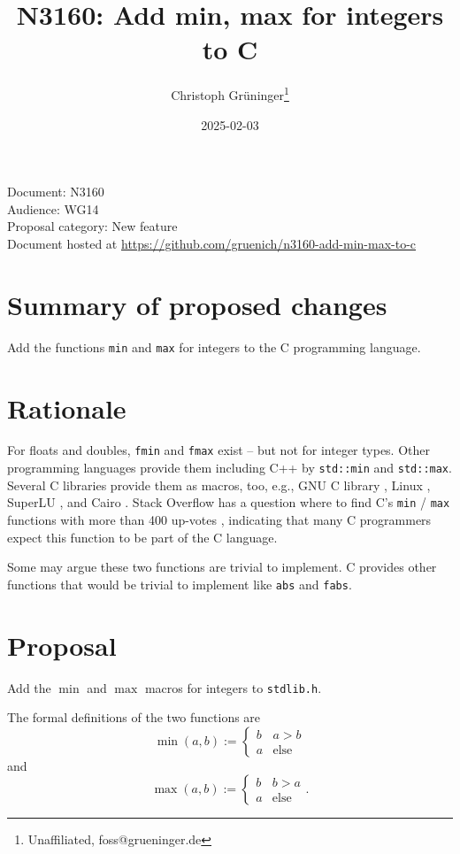 \documentclass[a4paper,10pt]{scrartcl}
\title{N3160: Add min, max for integers to C}
\author{Christoph Grüninger\footnote{Unaffiliated, foss@grueninger.de}}
\date{2025-02-03}
\begin{document}
\lstset{language=C,basicstyle=\ttfamily}

\maketitle

\noindent
Document: N3160\\
Audience: WG14\\
Proposal category: New feature\\
Document hosted at \url{https://github.com/gruenich/n3160-add-min-max-to-c}

\section{Summary of proposed changes}

Add the functions \lstinline{min} and \lstinline{max} for integers to the C programming language.

\section{Rationale}

For floats and doubles, \lstinline{fmin} and \lstinline{fmax} exist -- but not for integer types. Other
programming languages provide them including C++ by \lstinline{std::min} and \lstinline{std::max}. Several
C libraries provide them as macros, too, e.g., GNU C library \cite{GLibc}, Linux \cite{Linux},
SuperLU \cite{SuperLU}, and Cairo \cite{Cairo}.
Stack Overflow has a question where to find C's \lstinline{min} / \lstinline{max} functions with more
than 400 up-votes \cite{Stackoverflow}, indicating that many C programmers expect this function to be
part of the C language.

Some may argue these two functions are trivial to implement. C provides other functions that would be
trivial to implement like \lstinline{abs} and \lstinline{fabs}.

\section{Proposal}
Add the $\operatorname{min}$ and $\operatorname{max}$ macros for integers to \lstinline{stdlib.h}.

The formal definitions of the two functions are
\begin{equation*}
 \operatorname{min}(a, b) := \begin{cases}b & a > b\\ a & \text{else}\end{cases}
\end{equation*}
and
\begin{equation*}
 \operatorname{max}(a, b) := \begin{cases}b & b > a\\ a & \text{else}\end{cases}.
\end{equation*}
\end{document}
